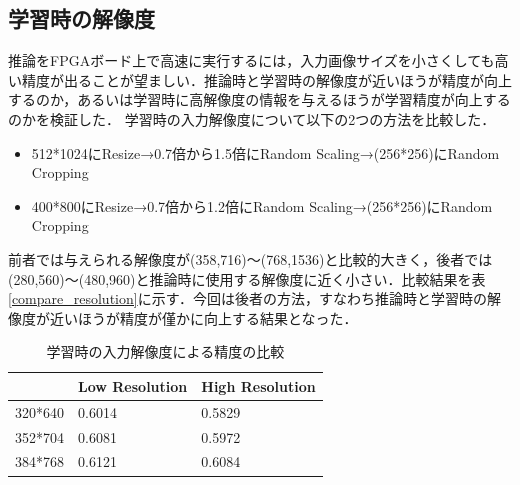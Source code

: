 \subsection{学習時の解像度}
推論をFPGAボード上で高速に実行するには，入力画像サイズを小さくしても高い精度が出ることが望ましい．推論時と学習時の解像度が近いほうが精度が向上するのか，あるいは学習時に高解像度の情報を与えるほうが学習精度が向上するのかを検証した．
学習時の入力解像度について以下の2つの方法を比較した．
\begin{itemize}
    \item{512*1024にResize→0.7倍から1.5倍にRandom Scaling→(256*256)にRandom Cropping}
    \item{400*800にResize→0.7倍から1.2倍にRandom Scaling→(256*256)にRandom Cropping}
\end{itemize}
前者では与えられる解像度が(358,716)〜(768,1536)と比較的大きく，後者では(280,560)〜(480,960)と推論時に使用する解像度に近く小さい．比較結果を表\ref{compare_resolution}に示す．今回は後者の方法，すなわち推論時と学習時の解像度が近いほうが精度が僅かに向上する結果となった．
\begin{table}[h]
    \caption{学習時の入力解像度による精度の比較} \vspace{1mm}
    \begin{center}
        \begin{tabular}{lll}
                & Low Resolution & High Resolution \\ \hline
        320*640 & 0.6014         & 0.5829            \\ \hline
        352*704 & 0.6081         & 0.5972               \\ \hline
        384*768 & 0.6121         & 0.6084
        \end{tabular}
    \end{center}
\end{table}

